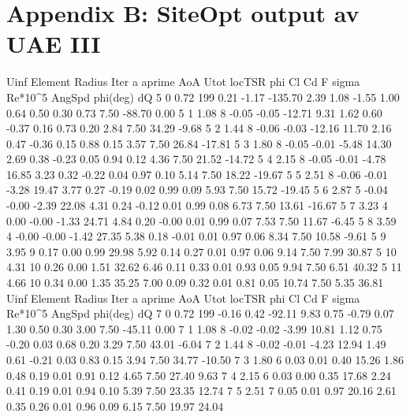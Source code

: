 \chapter{Appendix B: SiteOpt output av UAE III} \label{Chapter:output}
\begin{pythoncode}

Uinf  Element  Radius  Iter  a  aprime  AoA  Utot  locTSR  phi  Cl  Cd  F  sigma  Re*10^5  AngSpd  phi(deg)  dQ
5  0  0.72  199  0.21  -1.17  -135.70  2.39  1.08  -1.55  1.00  0.64  0.50  0.30  0.73  7.50  -88.70  0.00
5  1  1.08  8  -0.05  -0.05  -12.71  9.31  1.62  0.60  -0.37  0.16  0.73  0.20  2.84  7.50  34.29  -9.68
5  2  1.44  8  -0.06  -0.03  -12.16  11.70  2.16  0.47  -0.36  0.15  0.88  0.15  3.57  7.50  26.84  -17.81
5  3  1.80  8  -0.05  -0.01  -5.48  14.30  2.69  0.38  -0.23  0.05  0.94  0.12  4.36  7.50  21.52  -14.72
5  4  2.15  8  -0.05  -0.01  -4.78  16.85  3.23  0.32  -0.22  0.04  0.97  0.10  5.14  7.50  18.22  -19.67
5  5  2.51  8  -0.06  -0.01  -3.28  19.47  3.77  0.27  -0.19  0.02  0.99  0.09  5.93  7.50  15.72  -19.45
5  6  2.87  5  -0.04  -0.00  -2.39  22.08  4.31  0.24  -0.12  0.01  0.99  0.08  6.73  7.50  13.61  -16.67
5  7  3.23  4  0.00  -0.00  -1.33  24.71  4.84  0.20  -0.00  0.01  0.99  0.07  7.53  7.50  11.67  -6.45
5  8  3.59  4  -0.00  -0.00  -1.42  27.35  5.38  0.18  -0.01  0.01  0.97  0.06  8.34  7.50  10.58  -9.61
5  9  3.95  9  0.17  0.00  0.99  29.98  5.92  0.14  0.27  0.01  0.97  0.06  9.14  7.50  7.99  30.87
5  10  4.31  10  0.26  0.00  1.51  32.62  6.46  0.11  0.33  0.01  0.93  0.05  9.94  7.50  6.51  40.32
5  11  4.66  10  0.34  0.00  1.35  35.25  7.00  0.09  0.32  0.01  0.81  0.05  10.74  7.50  5.35  36.81
Uinf  Element  Radius  Iter  a  aprime  AoA  Utot  locTSR  phi  Cl  Cd  F  sigma  Re*10^5  AngSpd  phi(deg)  dQ
7  0  0.72  199  -0.16  0.42  -92.11  9.83  0.75  -0.79  0.07  1.30  0.50  0.30  3.00  7.50  -45.11  0.00
7  1  1.08  8  -0.02  -0.02  -3.99  10.81  1.12  0.75  -0.20  0.03  0.68  0.20  3.29  7.50  43.01  -6.04
7  2  1.44  8  -0.02  -0.01  -4.23  12.94  1.49  0.61  -0.21  0.03  0.83  0.15  3.94  7.50  34.77  -10.50
7  3  1.80  6  0.03  0.01  0.40  15.26  1.86  0.48  0.19  0.01  0.91  0.12  4.65  7.50  27.40  9.63
7  4  2.15  6  0.03  0.00  0.35  17.68  2.24  0.41  0.19  0.01  0.94  0.10  5.39  7.50  23.35  12.74
7  5  2.51  7  0.05  0.01  0.97  20.16  2.61  0.35  0.26  0.01  0.96  0.09  6.15  7.50  19.97  24.04

\end{pythoncode}
